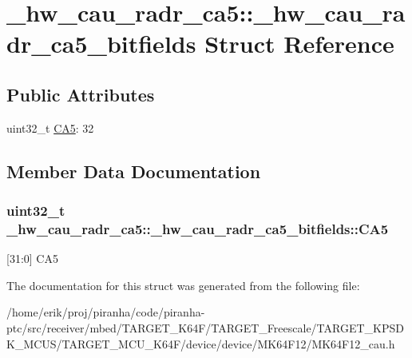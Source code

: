 \hypertarget{struct__hw__cau__radr__ca5_1_1__hw__cau__radr__ca5__bitfields}{}\section{\+\_\+hw\+\_\+cau\+\_\+radr\+\_\+ca5\+:\+:\+\_\+hw\+\_\+cau\+\_\+radr\+\_\+ca5\+\_\+bitfields Struct Reference}
\label{struct__hw__cau__radr__ca5_1_1__hw__cau__radr__ca5__bitfields}
\subsection*{Public Attributes}
\begin{DoxyCompactItemize}
\item 
uint32\+\_\+t \hyperlink{struct__hw__cau__radr__ca5_1_1__hw__cau__radr__ca5__bitfields_a28c831c2a15e646c1e60bc669dbf56f9}{C\+A5}\+: 32
\end{DoxyCompactItemize}


\subsection{Member Data Documentation}
\subsubsection[{\texorpdfstring{C\+A5}{CA5}}]{\setlength{\rightskip}{0pt plus 5cm}uint32\+\_\+t \+\_\+hw\+\_\+cau\+\_\+radr\+\_\+ca5\+::\+\_\+hw\+\_\+cau\+\_\+radr\+\_\+ca5\+\_\+bitfields\+::\+C\+A5}\hypertarget{struct__hw__cau__radr__ca5_1_1__hw__cau__radr__ca5__bitfields_a28c831c2a15e646c1e60bc669dbf56f9}{}\label{struct__hw__cau__radr__ca5_1_1__hw__cau__radr__ca5__bitfields_a28c831c2a15e646c1e60bc669dbf56f9}
\mbox{[}31\+:0\mbox{]} C\+A5 

The documentation for this struct was generated from the following file\+:\begin{DoxyCompactItemize}
\item 
/home/erik/proj/piranha/code/piranha-\/ptc/src/receiver/mbed/\+T\+A\+R\+G\+E\+T\+\_\+\+K64\+F/\+T\+A\+R\+G\+E\+T\+\_\+\+Freescale/\+T\+A\+R\+G\+E\+T\+\_\+\+K\+P\+S\+D\+K\+\_\+\+M\+C\+U\+S/\+T\+A\+R\+G\+E\+T\+\_\+\+M\+C\+U\+\_\+\+K64\+F/device/device/\+M\+K64\+F12/M\+K64\+F12\+\_\+cau.\+h\end{DoxyCompactItemize}
